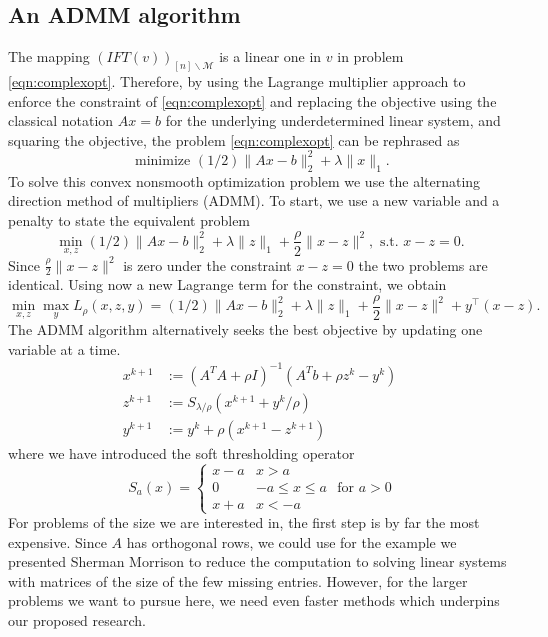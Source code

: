 \subsection{An ADMM algorithm} The mapping $\left(IFT(v)\right)_{[n]\backslash\mathcal{M}}$ is a linear one in $v$ in problem \eqref{eqn:complexopt}. Therefore, by using the Lagrange multiplier approach to enforce the constraint of \eqref{eqn:complexopt} and replacing the objective using the classical notation $Ax=b$ for the underlying underdetermined linear system, and squaring the objective, the problem \eqref{eqn:complexopt} can be rephrased as 
\begin{equation} \label{}
    \text { minimize }(1 / 2)\|A x-b\|_{2}^{2}+\lambda\|x\|_{1}.
\end{equation}
To solve this convex nonsmooth optimization problem we use the alternating direction method of multipliers (ADMM). 
To start, we use a new variable and a penalty to state the equivalent problem
\begin{equation}
    \min_{x, z}(1 / 2)\|A x-b\|_{2}^{2}+\lambda\|z\|_{1} + \frac{\rho}{2}\|x-z\|^2,\text{ s.t. }x - z = 0.
\end{equation}
Since $\frac{\rho}{2}\|x-z\|^2$ is zero under the constraint $x - z = 0$ the two problems are identical. Using now a new Lagrange term for the constraint, we obtain
\begin{equation}
    \min_{x,z}\max_{y} L_{\rho}(x,z,y) = (1 / 2)\|A x-b\|_{2}^{2}+\lambda\|z\|_{1} + \frac{\rho}{2}\|x-z\|^2 + y^{\top}(x-z).
\end{equation}
The ADMM algorithm alternatively seeks the best objective by updating one variable at a time. 
\begin{equation}
    \begin{aligned}
x^{k+1} &:=\left(A^{T} A+\rho I\right)^{-1}\left(A^{T} b+\rho z^{k}-y^{k}\right) \\
z^{k+1} &:=S_{\lambda / \rho}\left(x^{k+1}+y^{k} / \rho\right) \\
y^{k+1} &:=y^{k}+\rho\left(x^{k+1}-z^{k+1}\right)
\end{aligned}
\end{equation}
where we have introduced the soft thresholding operator
\begin{equation}
S_{a}(x) = \begin{cases}x-a & x > a \\ 0 & -a\leq x\leq a\\ x+a & x<-a\end{cases}   \text{ for }a>0
\end{equation}
For problems of the size we are interested in, the first step is by far the most expensive. Since $A$ has orthogonal rows, we could use for the example we presented Sherman Morrison to reduce the computation to solving linear systems with matrices of the size of the few missing entries.  
However, for the larger problems we want to pursue here, we need even faster methods which underpins our proposed research. 





